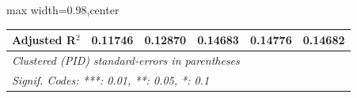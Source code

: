 \begin{table}[htbp]
\begin{adjustbox}{max width=0.98\textwidth,center}
\begin{tabular}{lccccc}
         Adjusted R$^2$                             & 0.11746         & 0.12870         & 0.14683         & 0.14776         & 0.14682\\  
         \midrule \midrule
         \multicolumn{6}{l}{\emph{Clustered (PID) standard-errors in parentheses}}\\
         \multicolumn{6}{l}{\emph{Signif. Codes: ***: 0.01, **: 0.05, *: 0.1}}\\
      \end{tabular}
   \end{adjustbox}
\end{table}


